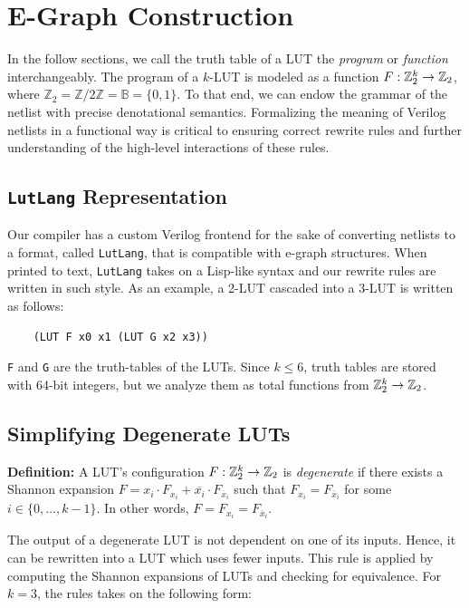 \section{E-Graph Construction}\label{sec:rewrites}

In the follow sections, we call the truth table of a LUT the \textit{program}
or \textit{function} interchangeably. The program of a $k$-LUT is modeled as a
function $F : \mathbb{Z}_{2}^{k} \rightarrow \mathbb{Z}_{2}$, where $\mathbb{Z}_2 = \mathbb{Z}/2\mathbb{Z}
    = \mathbb{B} = \{0,1\}$. To that end, we can endow the grammar of the netlist
with precise denotational semantics. Formalizing the meaning of Verilog
netlists in a functional way is critical to ensuring correct rewrite rules and
further understanding of the high-level interactions of these rules.

\subsection{\texttt{LutLang} Representation}\label{sec:rewrites:lutlang}

Our compiler has a custom Verilog frontend for the sake of converting netlists
to a format, called \texttt{LutLang}, that is compatible with e-graph
structures. When printed to text, \texttt{LutLang} takes on a Lisp-like syntax
and our rewrite rules are written in such style. As an example, a 2-LUT
cascaded into a 3-LUT is written as follows:

\begin{verbatim}
    (LUT F x0 x1 (LUT G x2 x3))
\end{verbatim}

\texttt{F} and \texttt{G} are the truth-tables of the LUTs. Since $k \leq 6$, truth tables are stored with 64-bit integers, but we analyze them as total functions from $\mathbb{Z}_{2}^{k} \rightarrow \mathbb{Z}_{2}$.

\subsection{Simplifying Degenerate LUTs}\label{sec:rewrites:degen}

\textbf{Definition:} A LUT's configuration $F : \mathbb{Z}_{2}^{k} \rightarrow \mathbb{Z}_{2}$ is \textit{degenerate} if there exists a Shannon expansion $F = x_i \cdot F_{x_i} + \overline{x_i} \cdot F_{\overline{x}_i}$
such that $F_{x_i} = F_{\overline{x}_i}$ for some $i \in \{ 0, \ldots, k -1\}$. In other words, $F = F_{x_i} = F_{\overline{x}_i}$.

The output of a degenerate LUT is not dependent on one of its inputs. Hence, it
can be rewritten into a LUT which uses fewer inputs. This rule is applied by
computing the Shannon expansions of LUTs and checking for equivalence. For
$k=3$, the rules takes on the following form:

